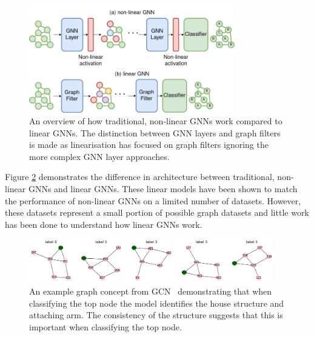 \begin{figure}
    \centering
    \captionsetup{width=0.9\textwidth}
    \includegraphics[width=0.8\textwidth]{figures/linear-vs-non-linear}
    \caption{An overview of how traditional, non-linear GNNs work compared to linear GNNs. The distinction between GNN layers and graph filters is made as linearisation has focused on graph filters ignoring the more complex GNN layer approaches.}
    \label{fig:linear-vs-non-linear}
\end{figure}

Figure \ref{fig:linear-vs-non-linear} demonstrates the difference in architecture between traditional, non-linear GNNs and linear GNNs.
These linear models have been shown to match the performance of non-linear GNNs on a limited number of datasets.
However, these datasets represent a small portion of possible graph datasets and little work has been done to understand how linear GNNs work.

\begin{figure}
    \centering
    \captionsetup{width=0.9\textwidth}
    \includegraphics[width=0.95\textwidth]{figures/concept}
    \caption{An example graph concept from GCN~\cite{kipf2016semi} demonstrating that when classifying the top node the model identifies the house structure and attaching arm. The consistency of the structure suggests that this is important when classifying the top node.}
    \label{fig:linear-vs-non-linear}
\end{figure}


